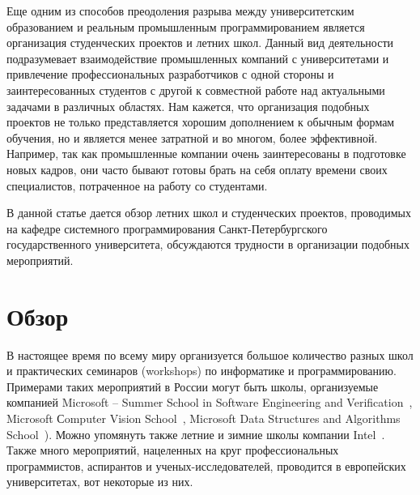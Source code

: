 \documentclass[a5paper]{article}
\begin{document}
Еще одним из способов преодоления разрыва между университетским образованием и реальным промышленным программированием является организация студенческих проектов и летних школ. Данный вид деятельности подразумевает взаимодействие промышленных компаний с университетами и привлечение профессиональных разработчиков с одной стороны и заинтересованных студентов с другой к совместной работе над актуальными задачами в различных областях. Нам кажется, что организация подобных проектов не только представляется хорошим дополнением к обычным формам обучения, но и является менее затратной и во многом, более эффективной. Например, так как промышленные компании очень заинтересованы в подготовке новых кадров, они часто бывают готовы брать на себя оплату времени своих специалистов, потраченное на работу со студентами. 
 
В данной статье дается обзор летних школ и студенческих проектов, проводимых на кафедре системного программирования Санкт-Петербургского государственного университета, обсуждаются трудности в организации подобных мероприятий.

\section{Обзор}

В настоящее время по всему миру организуется большое количество разных школ и практических семинаров (workshops) по информатике и программированию. Примерами таких мероприятий в России могут быть школы, организуемые компанией Microsoft --  Summer School in Software Engineering and Verification~\cite{ms1}, Microsoft Сomputer Vision School~\cite{ms2}, Microsoft Data Structures and Algorithms School~\cite{ms3}). Можно упомянуть также  летние и зимние школы компании Intel~\cite{intel1, intel2, intel3}. Также много мероприятий, нацеленных на круг профессиональных программистов,  аспирантов и ученых-исследователей, проводится в европейских университетах, вот некоторые из них. 
\end{document}
